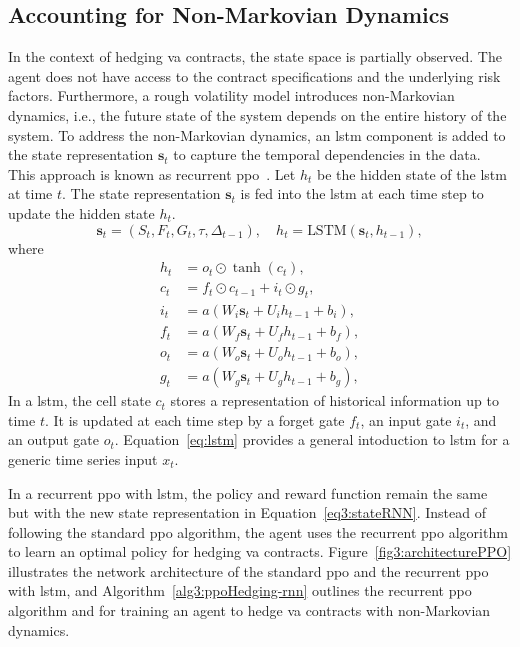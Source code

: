 \subsection{Accounting for Non-Markovian Dynamics}

In the context of hedging \gls{va} contracts, the state space is partially observed.
The agent does not have access to the contract specifications and the underlying risk factors.
Furthermore, a rough volatility model introduces non-Markovian dynamics, i.e., the future state of the system depends on the entire history of the system.
To address the non-Markovian dynamics, an \gls{lstm} component is added to the state representation $\mathbf{s}_t$ to capture the temporal dependencies in the data.
This approach is known as recurrent \gls{ppo}~\citep{ni2021recurrent}.
Let $h_t$ be the hidden state of the \gls{lstm} at time $t$.
The state representation $\mathbf{s}_t$ is fed into the \gls{lstm} at each time step to update the hidden state $h_t$.
\begin{equation} \label{eq3:stateRNN}
    \mathbf{s}_t = (S_t, F_t, G_t, \tau, \Delta_{t-1}), \quad h_t = \text{LSTM}(\mathbf{s}_t, h_{t-1}),
\end{equation}
where 
\begin{align} 
    h_t &= o_t \odot \tanh(c_t), \nonumber \\
    c_t &= f_t \odot c_{t-1} + i_t \odot g_t, \nonumber \\
    i_t &= a(W_i \mathbf{s}_t + U_i h_{t-1} + b_i), \nonumber \\
    f_t &= a(W_f \mathbf{s}_t + U_f h_{t-1} + b_f), \nonumber \\
    o_t &= a(W_o \mathbf{s}_t + U_o h_{t-1} + b_o), \nonumber \\
    g_t &= a(W_g \mathbf{s}_t + U_g h_{t-1} + b_g), 
\end{align}
In a \gls{lstm}, the cell state $c_t$ stores a representation of historical information up to time $t$.
It is updated at each time step by a forget gate $f_t$, an input gate $i_t$, and an output gate $o_t$.
Equation~\ref{eq:lstm} provides a general intoduction to \gls{lstm} for a generic time series input $x_t$.

In a recurrent \gls{ppo} with \gls{lstm}, the policy and reward function remain the same but with the new state representation in Equation~\eqref{eq3:stateRNN}.
Instead of following the standard \gls{ppo} algorithm, the agent uses the recurrent \gls{ppo} algorithm to learn an optimal policy for hedging \gls{va} contracts.
Figure~\ref{fig3:architecturePPO} illustrates the network architecture of the standard \gls{ppo} and the recurrent \gls{ppo} with \gls{lstm}, and Algorithm~\ref{alg3:ppoHedging-rnn} outlines the recurrent \gls{ppo} algorithm and for training an agent to hedge \gls{va} contracts with non-Markovian dynamics.

